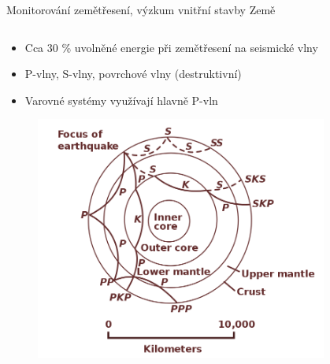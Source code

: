 \documentclass[10pt, notes=only]{beamer}
\begin{document}
\begin{frame}{Monitorování zemětřesení, výzkum vnitřní stavby Země}
    \begin{columns}
        \begin{column}{0.6\textwidth}
            \begin{itemize}
                \item Cca 30 \% uvolněné energie při zemětřesení na seismické vlny
                \item P-vlny, S-vlny, povrchové vlny (destruktivní)
                \item Varovné systémy využívají hlavně P-vln
            \end{itemize}
            \begin{figure}[h]
                \includegraphics[width=.65\textwidth]{wave_path.png}
            \end{figure}
        \end{column}
        \begin{column}{0.4\textwidth}
            \begin{figure}

\end{figure}
\end{column}
\end{columns}
\end{frame}
\end{document}
